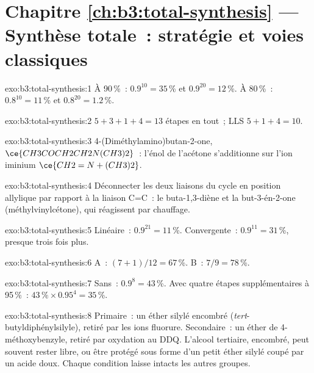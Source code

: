 \section*{Chapitre \ref{ch:b3:total-synthesis} --- Synthèse totale~: stratégie et voies classiques}

\begin{solution}{exo:b3:total-synthesis:1}
À 90\,\%~: $0.9^{10} = 35$\,\% et $0.9^{20} = 12$\,\%. À 80\,\%~: $0.8^{10} = 11$\,\% et $0.8^{20} = 1.2$\,\%.
\end{solution}

\begin{solution}{exo:b3:total-synthesis:2}
$5 + 3 + 1 + 4 = 13$ étapes en tout~; LLS $5 + 1 + 4 = 10$.
\end{solution}

\begin{solution}{exo:b3:total-synthesis:3}
4-(Diméthylamino)butan-2-one, $\ce{CH3COCH2CH2N(CH3)2}$~: l'énol de l'acétone s'additionne sur l'ion
iminium $\ce{CH2=N+(CH3)2}$.
\end{solution}

\begin{solution}{exo:b3:total-synthesis:4}
Déconnecter les deux liaisons du cycle en position allylique par rapport à
la liaison C=C~: le buta-1,3-diène et la but-3-én-2-one (méthylvinylcétone),
qui réagissent par chauffage.
\end{solution}

\begin{solution}{exo:b3:total-synthesis:5}
Linéaire~: $0.9^{21} = 11$\,\%. Convergente~: $0.9^{11} = 31$\,\%, presque trois fois plus.
\end{solution}

\begin{solution}{exo:b3:total-synthesis:6}
A~: $(7 + 1)/12 = 67$\,\%. B~: $7/9 = 78$\,\%.
\end{solution}

\begin{solution}{exo:b3:total-synthesis:7}
Sans~: $0.9^8 = 43$\,\%. Avec quatre étapes supplémentaires à 95\,\%~: $43\,\% \times 0.95^4 = 35$\,\%.
\end{solution}

\begin{solution}{exo:b3:total-synthesis:8}
Primaire~: un éther silylé encombré (\textit{tert}-butyldiphénylsilyle),
retiré par les ions fluorure. Secondaire~: un éther de 4-méthoxybenzyle,
retiré par oxydation au DDQ. L'alcool tertiaire, encombré, peut souvent
rester libre, ou être protégé sous forme d'un petit éther silylé coupé par
un acide doux. Chaque condition laisse intacts les autres groupes.
\end{solution}

